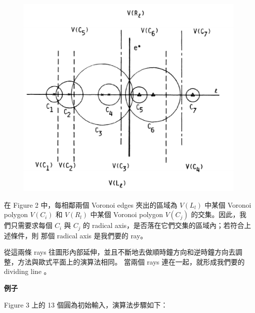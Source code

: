 \documentclass[12pt]{article}
\begin{document}
\begin{CJK}{UTF8}{bkai}
\begin{figure}[h]
\includegraphics[scale=0.5]{figure5(iv).eps}
\caption{}
\label{}
\end{figure}

在 Figure 2 中，每相鄰兩個 Voronoi edges 夾出的區域為 $V(L_l)$ 中某個 Voronoi polygon $V(C_i)$ 和 $V(R_l)$ 中某個 Voronoi polygon
 $V(C_j)$ 的交集。因此，我們只需要求每個 $C_i$ 與 $C_j$ 的 radical axis，是否落在它們交集的區域內；若符合上述條件，則
那個 radical axis 是我們要的 ray。


從這兩條 rays 往圖形內部延伸，並且不斷地去做順時鐘方向和逆時鐘方向去調整，方法與歐式平面上的演算法相同。
當兩個 rays 連在一起，就形成我們要的 dividing line 。\\



\centerline{\bf 例子}

Figure 3 上的 13 個圓為初始輸入，演算法步驟如下：

\begin{enumerate}


\end{enumerate}
\end{CJK}
\end{document}
